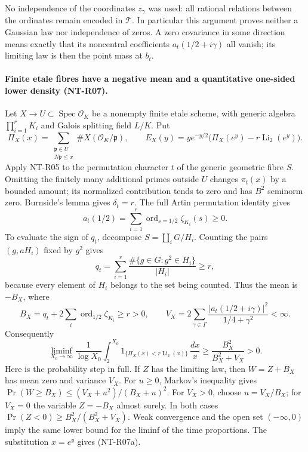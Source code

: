 No independence of the coordinates $z_\gamma$ was used: all rational
relations between the ordinates remain encoded in $\mathcal T$.
In particular this argument proves neither a Gaussian law nor
independence of zeros. A zero covariance in some direction means
exactly that its noncentral coefficients $a_t(1/2+i\gamma)$ all
vanish; its limiting law is then the point mass at $b_t$.

\paragraph{Finite etale fibres have a negative mean and a quantitative
one-sided lower density (NT-R07).}
Let $X\to U\subset\operatorname{Spec}\mathcal O_K$ be a nonempty
finite etale scheme, with generic algebra $\prod_{i=1}^r K_i$ and
Galois splitting field $L/K$. Put
\[
 \Pi_X(x)=\sum_{\substack{\mathfrak p\in U\\N\mathfrak p\le x}}
                         \#X(\mathcal O_K/\mathfrak p),\qquad
 E_X(y)=ye^{-y/2}\bigl(\Pi_X(e^y)-r\operatorname{Li}_2(e^y)\bigr).
\]
Apply NT-R05 to the permutation character $t$ of the generic
geometric fibre $S$. Omitting the finitely many additional primes
outside $U$ changes $\pi_t(x)$ by a bounded amount; its normalized
contribution tends to zero and has $B^2$ seminorm zero. Burnside's
lemma gives $\delta_t=r$. The full Artin permutation identity gives
\[
 a_t(1/2)=\sum_{i=1}^r\operatorname{ord}_{s=1/2}\zeta_{K_i}(s)
       \ge0.
\]
To evaluate the sign of $q_t$, decompose $S=\coprod_iG/H_i$.
Counting the pairs $(g,aH_i)$ fixed by $g^2$ gives
\[
 q_t=\sum_{i=1}^r
      \frac{\#\{g\in G:g^2\in H_i\}}{|H_i|}\ge r,
\]
because every element of $H_i$ belongs to the set being counted.
Thus the mean is $-B_X$, where
\[
 B_X=q_t+2\sum_i\operatorname{ord}_{1/2}\zeta_{K_i}\ge r>0,
 \qquad
 V_X=2\sum_{\gamma\in\Gamma}
          \frac{|a_t(1/2+i\gamma)|^2}{1/4+\gamma^2}<\infty.
\]
Consequently
\[
 \liminf_{X_0\to\infty}\frac1{\log X_0}
 \int_2^{X_0}
 1_{\{\Pi_X(x)<r\operatorname{Li}_2(x)\}}\,\frac{dx}{x}
       \ge\frac{B_X^2}{B_X^2+V_X}>0.
 \tag{NT-R07a}
\]
Here is the probability step in full. If $Z$ has the limiting law,
then $W=Z+B_X$ has mean zero and variance $V_X$. For $u\ge0$,
Markov's inequality gives
$\Pr(W\ge B_X)\le(V_X+u^2)/(B_X+u)^2$.
For $V_X>0$, choose $u=V_X/B_X$; for $V_X=0$ the variable
$Z=-B_X$ almost surely. In both cases
$\Pr(Z<0)\ge B_X^2/(B_X^2+V_X)$.
Weak convergence and the open set $(-\infty,0)$ imply the same
lower bound for the liminf of the time proportions. The substitution
$x=e^y$ gives (NT-R07a).

